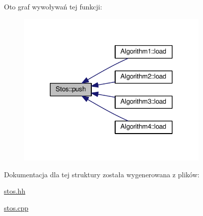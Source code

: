 Oto graf wywoływań tej funkcji\-:\nopagebreak
\begin{figure}[H]
\begin{center}
\leavevmode
\includegraphics[width=264pt]{struct_stos_afd5802e405946328cccca3eed676b493_icgraph}
\end{center}
\end{figure}




Dokumentacja dla tej struktury została wygenerowana z plików\-:\begin{DoxyCompactItemize}
\item 
\hyperlink{stos_8hh}{stos.\-hh}\item 
\hyperlink{stos_8cpp}{stos.\-cpp}\end{DoxyCompactItemize}
